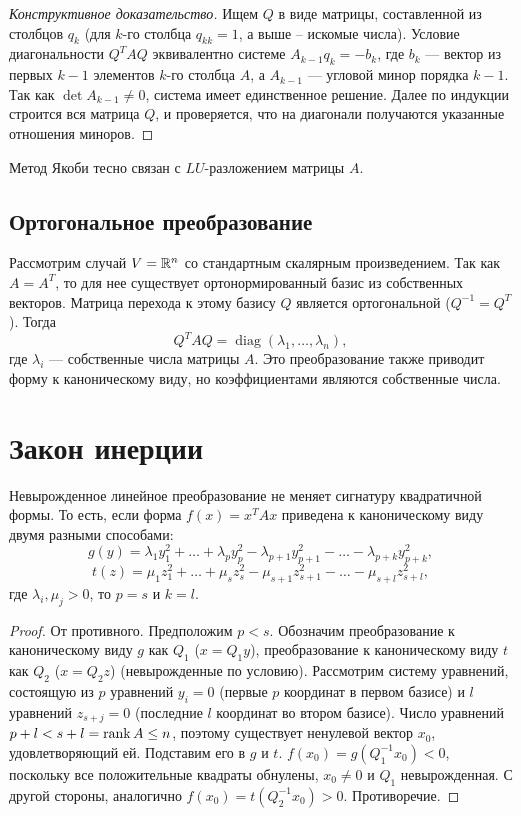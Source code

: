 \documentclass[12pt]{article}
\begin{document}
\begin{proof}[Конструктивное доказательство]
Ищем $Q$ в виде матрицы, составленной из столбцов $q_k$ (для $k$-го столбца $q_{kk}=1$, а выше -- искомые числа). Условие диагональности $Q^T A Q$ эквивалентно системе $A_{k-1} q_k = -b_k$, где $b_k$ --- вектор из первых $k-1$ элементов $k$-го столбца $A$, а $A_{k-1}$ --- угловой минор порядка $k-1$. Так как $\det A_{k-1} \neq 0$, система имеет единственное решение. Далее по индукции строится вся матрица $Q$, и проверяется, что на диагонали получаются указанные отношения миноров.
\end{proof}

\begin{remark}
Метод Якоби тесно связан с $LU$-разложением матрицы $A$.
\end{remark}

\subsection{Ортогональное преобразование}
Рассмотрим случай $V = \mathbb{R}^n$ со стандартным скалярным произведением. Так как $A = A^T$, то для нее существует ортонормированный базис из собственных векторов. Матрица перехода к этому базису $Q$ является ортогональной ($Q^{-1} = Q^T$). Тогда
\[
Q^T A Q = \operatorname{diag}(\lambda_1, \dots, \lambda_n),
\]
где $\lambda_i$ --- собственные числа матрицы $A$. Это преобразование также приводит форму к каноническому виду, но коэффициентами являются собственные числа.

\section{Закон инерции}
\begin{theorem}
Невырожденное линейное преобразование не меняет сигнатуру квадратичной формы. То есть, если форма $f(x) = x^T A x$ приведена к каноническому виду двумя разными способами:
\[
g(y) = \lambda_1 y_1^2 + \dots + \lambda_p y_p^2 - \lambda_{p+1} y_{p+1}^2 - \dots - \lambda_{p+k} y_{p+k}^2,
\]
\[
t(z) = \mu_1 z_1^2 + \dots + \mu_s z_s^2 - \mu_{s+1} z_{s+1}^2 - \dots - \mu_{s+l} z_{s+l}^2,
\]
где $\lambda_i, \mu_j > 0$, то $p = s$ и $k = l$.
\end{theorem}

\begin{proof}
От противного. Предположим $p < s$. Обозначим преобразование к каноническому виду $g$ как $Q_1$ ($x = Q_1 y$), преобразование к каноническому виду $t$ как $Q_2$ ($x = Q_2 z$) (невырожденные по условию).  Рассмотрим систему уравнений, состоящую из $p$ уравнений $y_i = 0$ (первые $p$ координат в первом базисе) и $l$ уравнений $z_{s+j} = 0$ (последние $l$ координат во втором базисе). Число уравнений $p+l < s+l = \operatorname{rank} A \le n$, поэтому существует ненулевой вектор $x_0$, удовлетворяющий ей. Подставим его в $g$ и $t$. $f(x_0) = g(Q_1^{-1} x_0) < 0$, поскольку все положительные квадраты обнулены, $x_0 \neq 0$ и $Q_1$ невырожденная. С другой стороны, аналогично $f(x_0) = t(Q_2^{-1} x_0) > 0$. Противоречие.
\end{proof}
\end{document}
